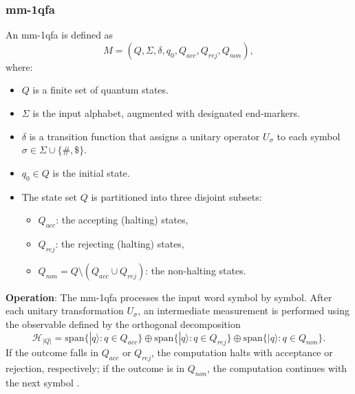 \subsubsection{\acrfull{mm-1qfa}}
\label{sssec:mm-1qfa}
\begin{definition}
An \gls{mm-1qfa} is defined as 
\[
M = (Q, \Sigma, \delta, q_0, Q_{acc}, Q_{rej}, Q_{non}),
\]
where:
\begin{itemize}
    \item \( Q \) is a finite set of quantum states.
    \item \( \Sigma \) is the input alphabet, augmented with designated end-markers.
    \item \( \delta \) is a transition function that assigns a unitary operator \( U_\sigma \) to each symbol \( \sigma \in \Sigma \cup \{\#, \$\} \).
    \item \( q_0 \in Q \) is the initial state.
    \item The state set \( Q \) is partitioned into three disjoint subsets:
    \begin{itemize}
        \item \( Q_{acc} \): the accepting (halting) states,
        \item \( Q_{rej} \): the rejecting (halting) states,
        \item \( Q_{non} = Q \setminus (Q_{acc} \cup Q_{rej}) \): the non-halting states.
    \end{itemize}
\end{itemize}
\end{definition}

\textbf{Operation}:  
The \gls{mm-1qfa} processes the input word symbol by symbol. After each unitary transformation \( U_\sigma \), an intermediate measurement is performed using the observable defined by the orthogonal decomposition 
\[
\mathcal{H}_{|Q|} = \mathrm{span}\{ |q\rangle : q \in Q_{acc} \} \oplus \mathrm{span}\{ |q\rangle : q \in Q_{rej} \} \oplus \mathrm{span}\{ |q\rangle : q \in Q_{non} \}.
\]
If the outcome falls in \( Q_{acc} \) or \( Q_{rej} \), the computation halts with acceptance or rejection, respectively; if the outcome is in \( Q_{non} \), the computation continues with the next symbol \cite{kondacs1997power,ambainis2009superiority}.

